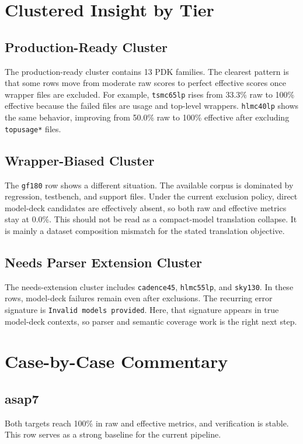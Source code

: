 \documentclass[12pt,a4paper,oneside]{report}
\begin{document}
\section{Clustered Insight by Tier}

\subsection{Production-Ready Cluster}
The production-ready cluster contains 13 PDK families. The clearest pattern is that some rows move from moderate raw scores to perfect effective scores once wrapper files are excluded. For example, \texttt{tsmc65lp} rises from 33.3\% raw to 100\% effective because the failed files are usage and top-level wrappers. \texttt{hlmc40lp} shows the same behavior, improving from 50.0\% raw to 100\% effective after excluding \texttt{topusage*} files.

\subsection{Wrapper-Biased Cluster}
The \texttt{gf180} row shows a different situation. The available corpus is dominated by regression, testbench, and support files. Under the current exclusion policy, direct model-deck candidates are effectively absent, so both raw and effective metrics stay at 0.0\%. This should not be read as a compact-model translation collapse. It is mainly a dataset composition mismatch for the stated translation objective.

\subsection{Needs Parser Extension Cluster}
The needs-extension cluster includes \texttt{cadence45}, \texttt{hlmc55lp}, and \texttt{sky130}. In these rows, model-deck failures remain even after exclusions. The recurring error signature is \texttt{Invalid models provided}. Here, that signature appears in true model-deck contexts, so parser and semantic coverage work is the right next step.

\section{Case-by-Case Commentary}

\subsection{asap7}
Both targets reach 100\% in raw and effective metrics, and verification is stable. This row serves as a strong baseline for the current pipeline.
\end{document}
